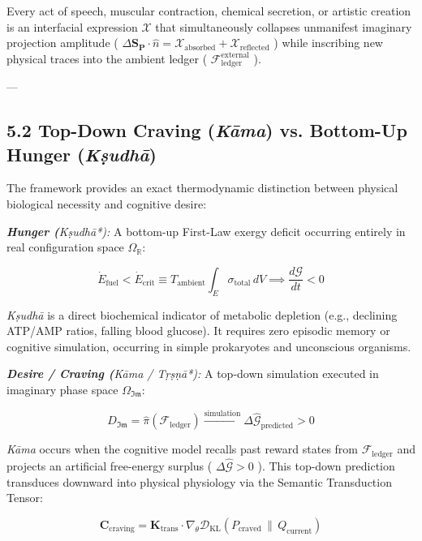 \documentclass[11pt,a4paper]{article}
\theoremstyle{definition}
\theoremstyle{remark}
\begin{document}
Every act of speech, muscular contraction, chemical secretion, or artistic creation is an interfacial expression $\boldsymbol{\mathcal{X}}$ that simultaneously collapses unmanifest imaginary projection amplitude ( $\Delta \mathbf{S}_{\mathbf{P}} \cdot \hat{n} = \mathcal{X}_{\text{absorbed}} + \mathcal{X}_{\text{reflected}}$ ) while inscribing new physical traces into the ambient ledger ( $\mathcal{F}_{\text{ledger}}^{\text{external}}$ ).

---

\subsection{5.2 Top-Down Craving (\textit{Kāma}) vs. Bottom-Up Hunger (\textit{Kṣudhā})}
The framework provides an exact thermodynamic distinction between physical biological necessity and cognitive desire:

\textit{ \textbf{Hunger (}Kṣudhā*):}
A bottom-up First-Law exergy deficit occurring entirely in real configuration space $\Omega_{\mathbb{R}}$:


\begin{equation}
\dot{E}_{\text{fuel}} < \dot{E}_{\text{crit}} \equiv T_{\text{ambient}} \int_E \sigma_{\text{total}} \, dV \implies \frac{d\mathcal{G}}{dt} < 0
\end{equation}


\textit{Kṣudhā} is a direct biochemical indicator of metabolic depletion (e.g., declining ATP/AMP ratios, falling blood glucose). It requires zero episodic memory or cognitive simulation, occurring in simple prokaryotes and unconscious organisms.

\textit{ \textbf{Desire / Craving (}Kāma / Tṛṣṇā*):}
A top-down simulation executed in imaginary phase space $\Omega_{\mathfrak{Im}}$:


\begin{equation}
D_{\mathfrak{Im}} = \hat{\pi}(\mathcal{F}_{\text{ledger}}) \xrightarrow{\text{simulation}} \Delta \hat{\mathcal{G}}_{\text{predicted}} > 0
\end{equation}


\textit{Kāma} occurs when the cognitive model recalls past reward states from $\mathcal{F}_{\text{ledger}}$ and projects an artificial free-energy surplus ( $\Delta \hat{\mathcal{G}} > 0$ ). This top-down prediction transduces downward into physical physiology via the Semantic Transduction Tensor:


\begin{equation}
\mathbf{C}_{\text{craving}} = \mathbf{K}_{\text{trans}} \cdot \nabla_\theta \mathcal{D}_{\text{KL}}\left( P_{\text{craved}} \,\|\, Q_{\text{current}} \right)
\end{equation}
\end{document}
